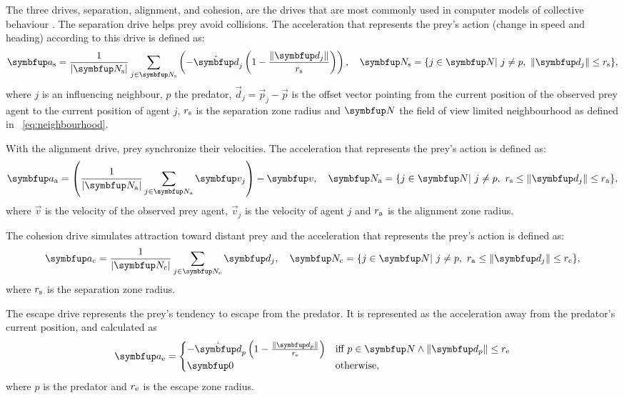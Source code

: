 The three drives, separation, alignment, and cohesion, are the drives that are most commonly used in computer models of collective behaviour \cite{reynolds1987flocks}. The separation drive helps prey avoid collisions. The acceleration that represents the prey's action (change in speed and heading) according to this drive is defined as:
%
\begin{equation}
\vec{a}_\textnormal{s}=\frac{1}{|\set{N}_\textnormal{s}|} \sum_{j \in \set{N}_\textnormal{s}}\left(-\uvec{d}_j\left(1-\frac{\|\vec{d}_j\|}{r_\textnormal{s}}\right)\right),\quad 
\set{N}_\textnormal{s} = \{j \in \set{N}|\ j \neq p,\ \|\vec{d}_j\| \leq r_\textnormal{s} \},
\end{equation}
%
where $j$ is an influencing neighbour, $p$ the predator, $\vec{d}_j=\vec{p}_j-\vec{p}$ is the offset vector pointing from the current position of the observed prey agent to the current position of agent $j$, $r_\textnormal{s}$ is the separation zone radius and $\set{N}$ the field of view limited neighbourhood as defined in \eq~\eqref{eq:neighbourhood}.

With the alignment drive, prey synchronize their velocities. The acceleration that represents the prey's action is defined as:
%
\begin{equation}
\vec{a}_\textnormal{a}=\left(\frac{1}{|\set{N}_\textnormal{a}|} \sum_{j \in \set{N}_\textnormal{a}} \vec{v}_j\right)-\vec{v},\quad 
\set{N}_\textnormal{a}=\{j \in \set{N}|\ j \neq p,\ r_\textnormal{s} \leq \|\vec{d}_j\| \leq r_\textnormal{a} \},
\end{equation}
%
where $\vec{v}$ is the velocity of the observed prey agent, $\vec{v}_j$ is the velocity of agent $j$ and $r_\textnormal{a}$ is the alignment zone radius.

The cohesion drive simulates attraction toward distant prey and the acceleration that represents the prey's action is defined as:
%
\begin{equation}
\vec{a}_\textnormal{c}=\frac{1}{|\set{N}_\textnormal{c}|} \sum_{j \in \set{N}_\textnormal{c}} \vec{d}_j,\quad \set{N}_\textnormal{c}=\{j \in \set{N}|\ j \neq p,\ r_\textnormal{a} \leq \|\vec{d}_j\| \leq r_\textnormal{c} \},
\end{equation}
%
where $r_\textnormal{s}$ is the separation zone radius.

The escape drive represents the prey's tendency to escape from the predator. It is represented as the acceleration away from the predator's current position, and calculated as
%
\begin{equation}
\vec{a}_\textnormal{e}=\begin{cases}
-\uvec{d}_p\left(1-\frac{\|\vec{d}_p\|}{r_\textnormal{e}}\right) & \textnormal{iff}\ p \in \set{N} \wedge \|\vec{d}_p\| \leq r_\textnormal{e}\\
\vec{0} & \textnormal{otherwise,}
\end{cases}
\end{equation}
%
where $p$ is the predator and $r_\textnormal{e}$ is the escape zone radius.

